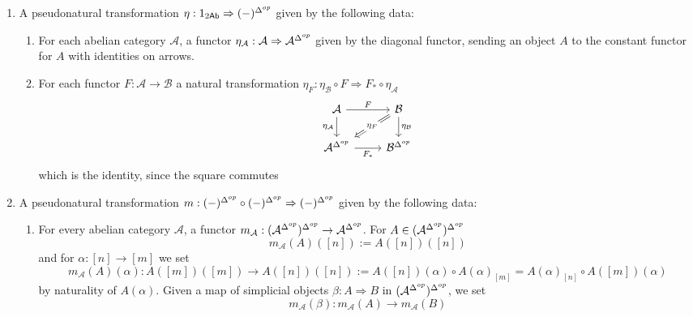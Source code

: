 \begin{enumerate}
    \item A pseudonatural transformation $\eta:1_{2\textup{\textsf{Ab}}}\Rightarrow (-)^{\Delta^{op}}$ given by the following data:
    \begin{enumerate}
        \item For each abelian category $\mathcal{A}$, a functor $\eta_\mathcal{A}:\mathcal{A}\Rightarrow \mathcal{A}^{\Delta^{op}}$ given by the diagonal functor, sending an object $A$ to the constant functor for $A$ with identities on arrows.
        \item For each functor $F:\mathcal{A}\rightarrow \mathcal{B}$ a natural transformation $\eta_F:\eta_\mathcal{B}\circ F\Rightarrow F_*\circ \eta_\mathcal{A}$
        \[\begin{tikzcd}
        	{\mathcal{A}} & {\mathcal{B}} \\
        	{\mathcal{A}\Sob} & {\mathcal{B}\Sob}
        	\arrow["F", from=1-1, to=1-2]
        	\arrow["{\eta_\mathcal{B}}", from=1-2, to=2-2]
        	\arrow["{\eta_\mathcal{A}}"', from=1-1, to=2-1]
        	\arrow["{F_*}"', from=2-1, to=2-2]
        	\arrow["{\eta_F}"{description}, Rightarrow, from=1-2, to=2-1]
        \end{tikzcd}\]
        which is the identity, since the square commutes
    \end{enumerate}
    \item A pseudonatural transformation $m:(-)^{\Delta^{op}}\circ (-)^{\Delta^{op}}\Rightarrow(-)^{\Delta^{op}}$ given by the following data:
    \begin{enumerate}
        \item For every abelian category $\mathcal{A}$, a functor $m_\mathcal{A}:(\mathcal{A}^{\Delta^{op}})^{\Delta^{op}}\rightarrow \mathcal{A}^{\Delta^{op}}$. For $A \in (\mathcal{A}^{\Delta^{op}})^{\Delta^{op}}$
        \begin{equation*}
            m_\mathcal{A}(A)([n]) := A([n])([n])
        \end{equation*}
        and for $\alpha:[n]\rightarrow [m]$ we set
        \begin{equation*}
            m_\mathcal{A}(A)(\alpha):A([m])([m])\rightarrow A([n])([n]) := A([n])(\alpha) \circ A(\alpha)_{[m]} = A(\alpha)_{[n]}\circ A([m])(\alpha)
        \end{equation*}
        by naturality of $A(\alpha)$. Given a map of simplicial objects $\beta:A\Rightarrow B$ in $(\mathcal{A}^{\Delta^{op}})^{\Delta^{op}}$, we set
        \begin{equation*}
            m_\mathcal{A}(\beta):m_\mathcal{A}(A)\rightarrow m_\mathcal{A}(B)

\end{equation*}
\end{enumerate}
\end{enumerate}
